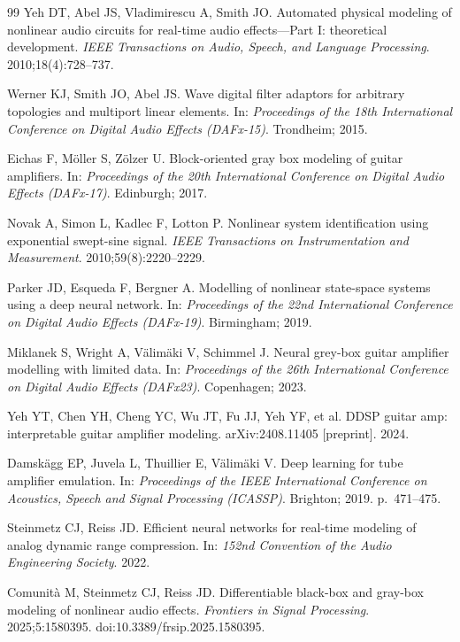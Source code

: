\documentclass[ENG]{TFUOC}%
\begin{document}
\begin{thebibliography}{99}
 Yeh DT, Abel JS, Vladimirescu A, Smith JO. Automated physical modeling of nonlinear audio circuits for real-time audio effects---Part I: theoretical development. \emph{IEEE Transactions on Audio, Speech, and Language Processing}. 2010;18(4):728--737.

 Werner KJ, Smith JO, Abel JS. Wave digital filter adaptors for arbitrary topologies and multiport linear elements. In: \emph{Proceedings of the 18th International Conference on Digital Audio Effects (DAFx-15)}. Trondheim; 2015.

 Eichas F, Möller S, Zölzer U. Block-oriented gray box modeling of guitar amplifiers. In: \emph{Proceedings of the 20th International Conference on Digital Audio Effects (DAFx-17)}. Edinburgh; 2017.

 Novak A, Simon L, Kadlec F, Lotton P. Nonlinear system identification using exponential swept-sine signal. \emph{IEEE Transactions on Instrumentation and Measurement}. 2010;59(8):2220--2229.

 Parker JD, Esqueda F, Bergner A. Modelling of nonlinear state-space systems using a deep neural network. In: \emph{Proceedings of the 22nd International Conference on Digital Audio Effects (DAFx-19)}. Birmingham; 2019.

 Miklanek S, Wright A, Välimäki V, Schimmel J. Neural grey-box guitar amplifier modelling with limited data. In: \emph{Proceedings of the 26th International Conference on Digital Audio Effects (DAFx23)}. Copenhagen; 2023.

 Yeh YT, Chen YH, Cheng YC, Wu JT, Fu JJ, Yeh YF, et al. DDSP guitar amp: interpretable guitar amplifier modeling. arXiv:2408.11405 [preprint]. 2024.

 Damskägg EP, Juvela L, Thuillier E, Välimäki V. Deep learning for tube amplifier emulation. In: \emph{Proceedings of the IEEE International Conference on Acoustics, Speech and Signal Processing (ICASSP)}. Brighton; 2019. p.~471--475.

 Steinmetz CJ, Reiss JD. Efficient neural networks for real-time modeling of analog dynamic range compression. In: \emph{152nd Convention of the Audio Engineering Society}. 2022.

 Comunità M, Steinmetz CJ, Reiss JD. Differentiable black-box and gray-box modeling of nonlinear audio effects. \emph{Frontiers in Signal Processing}. 2025;5:1580395. doi:10.3389/frsip.2025.1580395.


\end{thebibliography}
\end{document}
